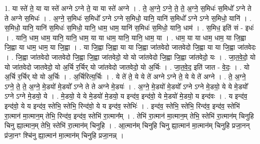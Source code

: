 \documentclass[17pt]{extarticle}
\begin{document}
1. या स्ते॑ ते॒ या या स्ते॑ अग्ने ऽग्ने ते॒ या या स्ते॑ अग्ने । . ते॒ अ॒ग्ने॒ ऽग्ने॒ ते॒ ते॒ अ॒ग्ने॒ स॒मिधः॑ स॒मिधो᳚ ऽग्ने ते ते अग्ने स॒मिधः॑ । . अ॒ग्ने॒ स॒मिधः॑ स॒मिधो᳚ ऽग्ने ऽग्ने स॒मिधो॒ यानि॒ यानि॑ स॒मिधो᳚ ऽग्ने ऽग्ने स॒मिधो॒ यानि॑ । . स॒मिधो॒ यानि॒ यानि॑ स॒मिधः॑ स॒मिधो॒ यानि॒ धाम॒ धाम॒ यानि॑ स॒मिधः॑ स॒मिधो॒ यानि॒ धाम॑ । . स॒मिध॒ इति॑ सं - इधः॑ । . यानि॒ धाम॒ धाम॒ यानि॒ यानि॒ धाम॒ या या धाम॒ यानि॒ यानि॒ धाम॒ या । . धाम॒ या या धाम॒ धाम॒ या जि॒ह्वा जि॒ह्वा या धाम॒ धाम॒ या जि॒ह्वा । . या जि॒ह्वा जि॒ह्वा या या जि॒ह्वा जा॑तवेदो जातवेदो जि॒ह्वा या या जि॒ह्वा जा॑तवेदः । . जि॒ह्वा जा॑तवेदो जातवेदो जि॒ह्वा जि॒ह्वा जा॑तवेदो॒ यो यो जा॑तवेदो जि॒ह्वा जि॒ह्वा जा॑तवेदो॒ यः । . जा॒त॒वे॒दो॒ यो यो जा॑तवेदो जातवेदो॒ यो अ॒र्चि र॒र्चिर् यो जा॑तवेदो जातवेदो॒ यो अ॒र्चिः । . जा॒त॒वे॒द॒ इति॑ जात - वे॒दः॒ । . यो अ॒र्चि र॒र्चिर् यो यो अ॒र्चिः । . अ॒र्चिरित्य॒र्चिः । . ये ते॑ ते॒ ये ये ते॑ अग्ने ऽग्ने ते॒ ये ये ते॑ अग्ने । . ते॒ अ॒ग्ने॒ ऽग्ने॒ ते॒ ते॒ अ॒ग्ने॒ मे॒डयो॑ मे॒डयो᳚ ऽग्ने ते ते अग्ने मे॒डयः॑ । . अ॒ग्ने॒ मे॒डयो॑ मे॒डयो᳚ ऽग्ने ऽग्ने मे॒डयो॒ ये ये मे॒डयो᳚ ऽग्ने ऽग्ने मे॒डयो॒ ये । . मे॒डयो॒ ये ये मे॒डयो॑ मे॒डयो॒ य इन्द॑व॒ इन्द॑वो॒ ये मे॒डयो॑ मे॒डयो॒ य इन्द॑वः । . य इन्द॑व॒ इन्द॑वो॒ ये य इन्द॑व॒ स्तेभि॒ स्तेभि॒ रिन्द॑वो॒ ये य इन्द॑व॒ स्तेभिः॑ । . इन्द॑व॒ स्तेभि॒ स्तेभि॒ रिन्द॑व॒ इन्द॑व॒ स्तेभि॑ रा॒त्मान॑ मा॒त्मान॒म् तेभि॒ रिन्द॑व॒ इन्द॑व॒ स्तेभि॑ रा॒त्मान᳚म् । . तेभि॑ रा॒त्मान॑ मा॒त्मान॒म् तेभि॒ स्तेभि॑ रा॒त्मान॑म् चिनुहि चिनु ह्या॒त्मान॒म् तेभि॒ स्तेभि॑ रा॒त्मान॑म् चिनुहि । . आ॒त्मान॑म् चिनुहि चिनु ह्या॒त्मान॑ मा॒त्मान॑म् चिनुहि प्रजा॒नन् प्र॑जा॒नꣳ श्चि॑नु ह्या॒त्मान॑ मा॒त्मान॑म् चिनुहि प्रजा॒नन्न् । \newline
\end{document}
